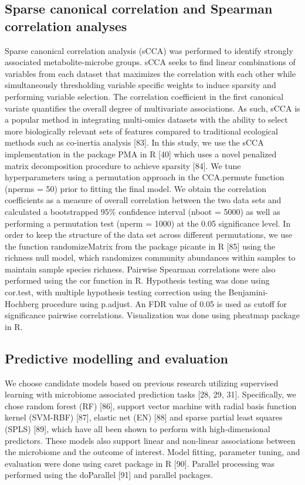 \subsection{Sparse canonical correlation and Spearman correlation analyses}
Sparse canonical correlation analysis (sCCA) was performed to identify strongly associated metabolite-microbe groups. sCCA seeks to find linear combinations of variables from each dataset that maximizes the correlation with each other while simultaneously thresholding variable specific weights to induce sparsity and performing variable selection. The correlation coefficient in the first canonical variate quantifies the overall degree of multivariate associations. As such, sCCA is a popular method in integrating multi-omics datasets with the ability to select more biologically relevant sets of features compared to traditional ecological methods such as co-inertia analysis [83]. In this study, we use the sCCA implementation in the package PMA in R [40] which uses a novel penalized matrix decomposition procedure to achieve sparsity [84]. We tune hyperparameters using a permutation approach in the CCA.permute function (nperms = 50) prior to fitting the final model. We obtain the correlation coefficients as a measure of overall correlation between the two data sets and calculated a bootstrapped 95\% confidence interval (nboot = 5000) as well as performing a permutation test (nperm = 1000) at the 0.05 significance level. In order to keep the structure of the data set across different permutations, we use the function randomizeMatrix from the package picante in R [85] using the richness null model, which randomizes community abundances within samples to maintain sample species richness.  
Pairwise Spearman correlations were also performed using the cor function in R. Hypothesis testing was done using cor.test, with multiple hypothesis testing correction using the Benjamini-Hochberg procedure using p.adjust. An FDR value of 0.05 is used as cutoff for significance pairwise correlations. Visualization was done using pheatmap package in R.  
\subsection{Predictive modelling and evaluation}
We choose candidate models based on previous research utilizing supervised learning with microbiome associated prediction tasks [28, 29, 31]. Specifically, we chose random forest (RF) [86], support vector machine with radial basis function kernel (SVM-RBF) [87], elastic net (EN) [88] and sparse partial least squares (SPLS) [89], which have all been shown to perform with high-dimensional predictors. These models also support linear and non-linear associations between the microbiome and the outcome of interest. Model fitting, parameter tuning, and evaluation were done using caret package in R [90]. Parallel processing was performed using the doParallel [91] and parallel packages. 

